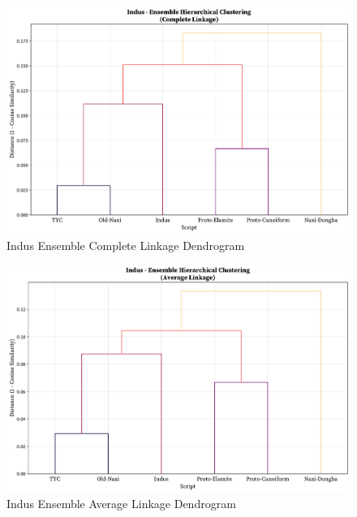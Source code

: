 \documentclass[11pt,a4paper,oneside]{report}
\begin{document}
\begin{figure}[H] 
    \centering
    \includegraphics[width=1\linewidth]{Visualizations/Dendrograms/Indus/ensemble_dendrogram_complete.pdf}
     \caption*{Indus Ensemble Complete Linkage Dendrogram}
\end{figure}

\begin{figure}[H] 
    \centering
    \includegraphics[width=1\linewidth]{Visualizations/Dendrograms/Indus/ensemble_dendrogram_average.pdf}
     \caption*{Indus Ensemble Average Linkage Dendrogram}
\end{figure}
\end{document}
